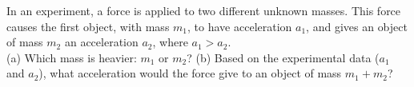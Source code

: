 In an experiment, a force is applied to two different unknown masses.
This force causes the first object, with mass $m_1$, to have acceleration
$a_1$, and gives an object of mass $m_2$ an acceleration $a_2$, where $a_1> a_2$.\\
%
(a) Which mass is heavier: $m_1$ or $m_2$?\hwendpart
%
(b) Based on the experimental data ($a_1$ and $a_2$),
what acceleration would the force give to an object of mass $m_1+ m_2$?\answercheck
